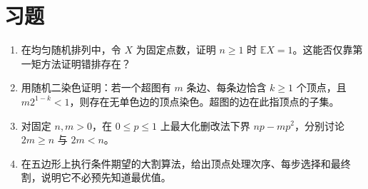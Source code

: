 \section{习题}
\begin{enumerate}
  \item\label{ex:probabilistic-1} 在均匀随机排列中，令 $X$ 为固定点数，证明 $n\ge1$ 时 $\mathbb E X=1$。这能否仅靠第一矩方法证明错排存在？
  \item\label{ex:probabilistic-2} 用随机二染色证明：若一个超图有 $m$ 条边、每条边恰含 $k\ge1$ 个顶点，且 $m2^{1-k}<1$，则存在无单色边的顶点染色。超图的边在此指顶点的子集。
  \item\label{ex:probabilistic-3} 对固定 $n,m>0$，在 $0\le p\le1$ 上最大化删改法下界 $np-mp^2$，分别讨论 $2m\ge n$ 与 $2m<n$。
  \item\label{ex:probabilistic-4} 在五边形上执行条件期望的大割算法，给出顶点处理次序、每步选择和最终割，说明它不必预先知道最优值。
\end{enumerate}

